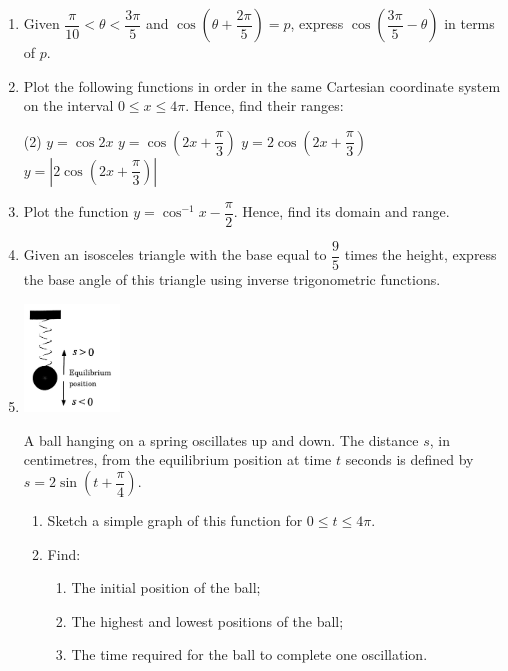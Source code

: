 \documentclass{report}
\begin{document}
\begin{enumerate}[start=4]
    \item Given \( \dfrac{\pi}{10}<\theta<\dfrac{3 \pi}{5} \) and \( \cos \left(\theta+\dfrac{2 \pi}{5}\right)=p \), express \( \cos \left(\dfrac{3 \pi}{5}-\theta\right) \) in terms of \( p \).
    
    \item Plot the following functions in order in the same Cartesian coordinate system on the interval \( 0 \leq x \leq 4 \pi \). Hence, find their ranges:
    \begin{tasks}[label=(\alph*)](2)
        \task \( y=\cos 2 x \)
        \task \( y=\cos \left(2 x+\dfrac{\pi}{3}\right) \)
        \task \( y=2 \cos \left(2 x+\dfrac{\pi}{3}\right) \)
        \task \( y=\left|2 \cos \left(2 x+\dfrac{\pi}{3}\right)\right| \)
    \end{tasks}
    
    \item Plot the function \( y=\cos^{-1} x-\dfrac{\pi}{2} \). Hence, find its domain and range.
    
    \item Given an isosceles triangle with the base equal to \(\dfrac{9}{5}\) times the height, express the base angle of this triangle using inverse trigonometric functions.
    
    \item \parbox[t]{\textwidth}{\begin{center}
        \includegraphics[width=0.2\textwidth]{assets/9-45.jpg}
    \end{center}}
    
    A ball hanging on a spring oscillates up and down. The distance \( s \), in centimetres, from the equilibrium position at time \( t \) seconds is defined by \( s=2 \sin \left(t+\dfrac{\pi}{4}\right) \).
    \begin{enumerate}
        \item Sketch a simple graph of this function for \( 0 \leq t \leq 4 \pi \).
        \item Find:
        \begin{enumerate}
            \item The initial position of the ball;
            \item The highest and lowest positions of the ball;
            \item The time required for the ball to complete one oscillation.
        \end{enumerate}
    \end{enumerate}
    

\end{enumerate}
\end{document}
